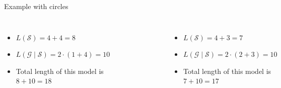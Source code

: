 \documentclass[10pt]{beamer}
\begin{document}
\begin{frame}{Example with circles}

    \begin{columns}[T, onlytextwidth]
            \begin{itemize}
                \item $L(\mathcal{S}) = 4 + 4 = 8$
                \item $L(\mathcal{G} \mid \mathcal{S}) = 2\cdot (1 + 4) = 10$
                \item Total length of this model is $8 + 10 = 18$
            \end{itemize}

        \begin{figure}
            \centering
            \includegraphics[scale=0.5]{figures/running-example/MDL/example-1.pdf}
        \end{figure}


            \begin{itemize}
                \item $L(\mathcal{S}) = 4 + 3 = 7$
                \item $L(\mathcal{G} \mid \mathcal{S}) = 2\cdot (2 + 3) = 10$
                \item Total length of this model is $7 + 10 = 17$
            \end{itemize}


\end{columns}
\end{frame}
\end{document}
